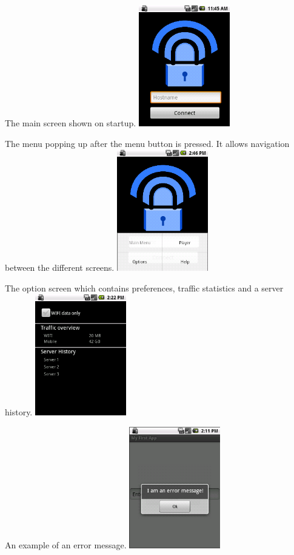 \documentclass[a4paper,10pt]{scrartcl}
\begin{document}
\begin{illustration}{The main screen shown on startup.}
\includegraphics[width=150px]{figures/images/mainscreen.png}
\end{illustration}
\begin{illustration}{The menu popping up after the menu button is pressed.
   It allows navigation between the different screens.}
\includegraphics[width=150px]{figures/images/menu.png}
\end{illustration}
\begin{illustration}{The option screen which contains preferences, traffic statistics and a server history.}
\includegraphics[width=150px]{figures/images/optionscreen.png}
\end{illustration}
\begin{illustration}{An example of an error message.}
\includegraphics[width=150px]{figures/images/error.png}
\end{illustration}
\end{document}
